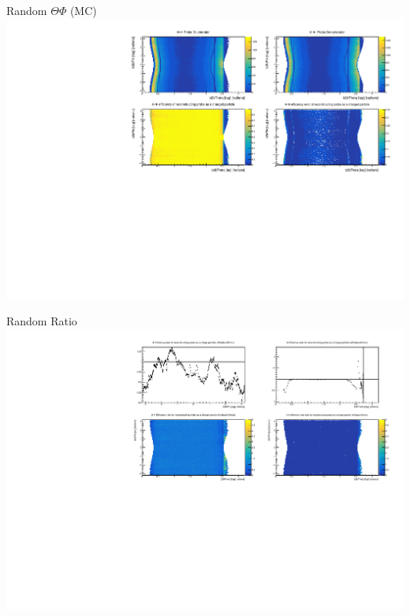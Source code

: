 \documentclass[10pt]{beamer}
\begin{document}
\begin{frame}{Random $\Theta \Phi$ (MC)}
	\centering
	\includegraphics[width=\textwidth]{Additional/RandomTP_MC}
\end{frame}


\begin{frame}{Random Ratio}
	\centering
	\includegraphics[width=\textwidth]{Additional/RandomRatio}
\end{frame}







\end{document}
